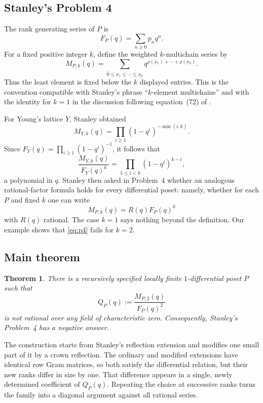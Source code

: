 \documentclass[11pt]{amsart}
\newtheorem{theorem}{Theorem}[section]
\theoremstyle{remark}
\begin{document}
\subsection{Stanley's Problem 4}
The rank generating series of $P$ is
\[
F_P(q)=\sum_{n\geq0}p_nq^n.
\]
For a fixed positive integer $k$, define the weighted $k$-multichain series by
\begin{equation}
M_{P,k}(q)=
\sum_{\widehat{0}\leq x_1\leq\cdots\leq x_k}
q^{\rho(x_1)+\cdots+\rho(x_k)}.
\label{eq:multichain}
\end{equation}
Thus the least element is fixed below the $k$ displayed entries. This is the convention compatible with Stanley's phrase ``$k$-element multichains'' and with the identity for $k=1$ in the discussion following equation~(72) of \cite{Sta88}.

For Young's lattice $Y$, Stanley obtained
\[
M_{Y,k}(q)=\prod_{i\geq1}(1-q^i)^{-\min(i,k)}.
\]
Since $F_Y(q)=\prod_{i\geq1}(1-q^i)^{-1}$, it follows that
\begin{equation}
\frac{M_{Y,k}(q)}{F_Y(q)^k}
=
\prod_{1\leq i<k}(1-q^i)^{k-i},
\label{eq:young}
\end{equation}
a polynomial in $q$. Stanley then asked in Problem~4 whether an analogous rational-factor formula holds for every differential poset: namely, whether for each $P$ and fixed $k$ one can write
\begin{equation}
M_{P,k}(q)=R(q)F_P(q)^k
\label{eq:p4}
\end{equation}
with $R(q)$ rational. The case $k=1$ says nothing beyond the definition. Our example shows that \eqref{eq:p4} fails for $k=2$.

\subsection{Main theorem}
\begin{theorem}\label{thm:main}
There is a recursively specified locally finite $1$-differential poset $P$ such that
\[
Q_P(q):=\frac{M_{P,2}(q)}{F_P(q)^2}
\]
is not rational over any field of characteristic zero. Consequently, Stanley's Problem~4 has a negative answer.
\end{theorem}

The construction starts from Stanley's reflection extension and modifies one small part of it by a crown reflection. The ordinary and modified extensions have identical row Gram matrices, so both satisfy the differential relation, but their new ranks differ in size by one. That difference appears in a single, newly determined coefficient of $Q_P(q)$. Repeating the choice at successive ranks turns the family into a diagonal argument against all rational series.
\end{document}
